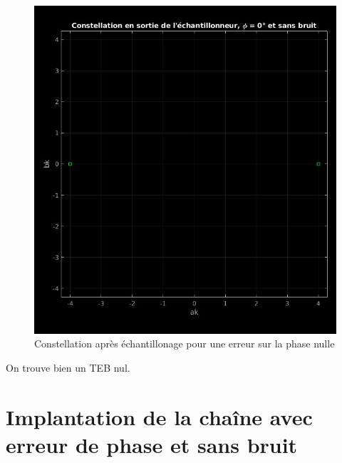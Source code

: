 \documentclass[11pt,a4paper]{report}
\begin{document}
\begin{figure}[H]
    \centering
    \includegraphics[width=7 cm]{Screenshots/2_2_1.jpg}
    \caption{Constellation après échantillonage pour une erreur sur la phase nulle}
    \label{fig:un_label} 
\end{figure}



\begin{table}[H]
        \centering
        \fontsize{12}{20}\selectfont
        \caption{TEB obtenu sans déphasage et sans bruit}
        \label{tableau_power}
\end{table}

On trouve bien un TEB nul.


\section{Implantation de la chaîne avec erreur de phase et sans bruit}
\end{document}
